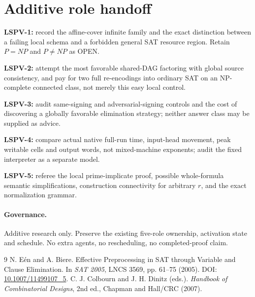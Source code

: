 \documentclass[10pt]{article}
\begin{document}
\section{Additive role handoff}
\begin{description}[leftmargin=0pt,labelwidth=0pt,itemsep=2pt]
\item[] \textbf{LSPV-1:} record the affine-cover infinite family and the exact distinction between a failing local schema and a forbidden general SAT resource region. Retain $P=NP$ and $P\ne NP$ as OPEN.
\item[] \textbf{LSPV-2:} attempt the most favorable shared-DAG factoring with global source consistency, and pay for two full re-encodings into ordinary SAT on an NP-complete connected class, not merely this easy local control.
\item[] \textbf{LSPV-3:} audit same-signing and adversarial-signing controls and the cost of discovering a globally favorable elimination strategy; neither answer class may be supplied as advice.
\item[] \textbf{LSPV-4:} compare actual native full-run time, input-head movement, peak writable cells and output words, not mixed-machine exponents; audit the fixed interpreter as a separate model.
\item[] \textbf{LSPV-5:} referee the local prime-implicate proof, possible whole-formula semantic simplifications, construction connectivity for arbitrary $r$, and the exact normalization grammar.
\end{description}
\paragraph{Governance.} Additive research only. Preserve the existing five-role ownership, activation state and schedule. No extra agents, no rescheduling, no completed-proof claim.
\begin{thebibliography}{9}
 N. E\'en and A. Biere. Effective Preprocessing in SAT through Variable and Clause Elimination. In \emph{SAT 2005}, LNCS 3569, pp. 61--75 (2005). DOI: \href{https://doi.org/10.1007/11499107_5}{10.1007/11499107\_5}.
 C. J. Colbourn and J. H. Dinitz (eds.). \emph{Handbook of Combinatorial Designs}, 2nd ed., Chapman and Hall/CRC (2007).
\end{thebibliography}
\end{document}
